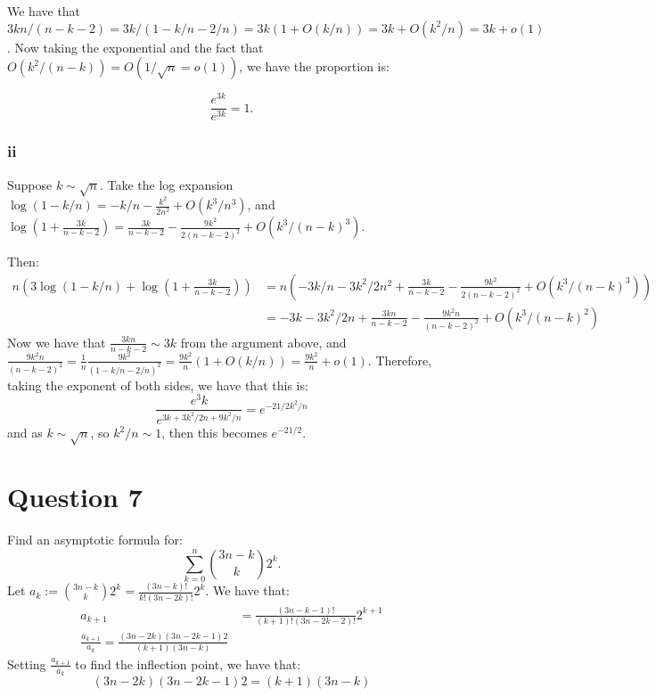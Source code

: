 \documentclass[]{article}
\theoremstyle{definition}
\numberwithin{theorem}{section}
\numberwithin{equation}{section}
\begin{document}
We have that $3kn/(n - k - 2) = 3k/(1 - k/n - 2/n) = 3k(1 + O(k/n)) = 3k + O(k^2/n) =  3k + o(1)$. 
Now taking the exponential and the fact that $O(k^2/(n - k)) = O(1/\sqrt{n} = o(1))$, we have the proportion is:

\begin{equation}
	\frac{e^{3k}}{e^{3k}} = 1. 
\end{equation}

\subsubsection{ii}
Suppose $k \sim \sqrt{n}$. 
Take the log expansion 
$\log(1 - k/n)  = -k/n - \frac{k^2}{2n^2} + O(k^3/n^3)$, and $\log\left(1 + \frac{3k}{n - k - 2}\right) = \frac{3k}{n - k - 2} - \frac{9k^2}{2(n - k - 2)^2} + O(k^3/(n - k)^3)$. 

Then:
\begin{align*}
	n \left( 3 \log(1 - k/n) + \log\left(1 + \frac{3k}{n - k - 2}\right)\right) &=
	n \left(-3k/n - 3k^2/2n^2 + \frac{3k}{n - k - 2} - \frac{9k^2}{2(n - k - 2)^2} + O(k^3/(n - k)^3)\right)\\
	&= -3k - 3k^2/2n + \frac{3kn}{n - k - 2} - \frac{9k^2 n}{(n - k - 2)^2} + O(k^3/(n - k)^2)
\end{align*}
Now we have that $\frac{3kn}{n - k - 2}  \sim 3k$ from the argument above, and $\frac{9k^2 n}{(n - k - 2)^2} = \frac{1}{n} \frac{9 k^2}{(1 - k/n - 2/n)^2} = \frac{9k^2}{n}(1 + O(k/n)) = \frac{9k^2}{n} + o(1)$. Therefore, taking the exponent of both sides, we have that this is:
\begin{equation}
	\frac{e^3k }{e^{3k + 3k^2/2n + 9k^2/n}} = e^{-21/2 k^2/n}
\end{equation}
and as $k \sim \sqrt{n}$, so $k^2/n \sim 1$, then this becomes $e^{-21/2}$. 

\section{Question 7}
Find an asymptotic formula for:
\begin{equation}
	\sum_{k = 0}^n \binom{3n - k}{k} 2^k.
\end{equation}
Let $a_k := \binom{3n - k}{k} 2^k = \frac{(3n - k)!}{k! (3n - 2k)!} 2^k$.
We have that:
\begin{align*}
	a_{k + 1} &= \frac{(3n - k - 1)!}{(k + 1)! (3n - 2k - 2)!} 2^{k + 1}\\
	\frac{a_{k + 1}}{a_k} = \frac{(3n - 2k)(3n - 2k - 1) 2}{(k + 1)(3n - k)}
\end{align*}
Setting $\frac{a_{k + 1}}{a_k}$ to find the inflection point, we have that:
\begin{equation}
	(3n - 2k)(3n - 2k - 1) 2 = (k + 1)(3n - k)
\end{equation}
\end{document}
